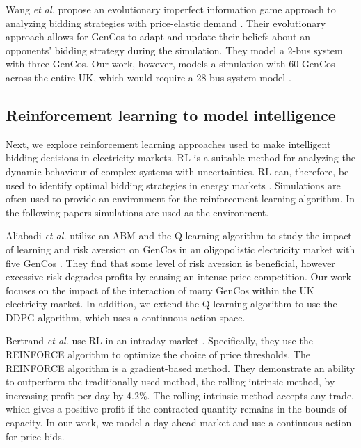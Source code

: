 Wang \textit{et al.} propose an evolutionary imperfect information game approach to analyzing bidding strategies with price-elastic demand \cite{Wang2011}. Their evolutionary approach allows for GenCos to adapt and update their beliefs about an opponents' bidding strategy during the simulation. They model a 2-bus system with three GenCos. Our work, however, models a simulation with 60 GenCos across the entire UK, which would require a 28-bus system model \cite{Bell2010}. 

\subsection{Reinforcement learning to model intelligence}

Next, we explore reinforcement learning approaches used to make intelligent bidding decisions in electricity markets. RL is a suitable method for analyzing the dynamic behaviour of complex systems with uncertainties. RL can, therefore, be used to identify optimal bidding strategies in energy markets \cite{Yang2020}. Simulations are often used to provide an environment for the reinforcement learning algorithm. In the following papers simulations are used as the environment.


Aliabadi \textit{et al.} utilize an ABM and the Q-learning algorithm to study the impact of learning and risk aversion on GenCos in an oligopolistic electricity market with five GenCos \cite{EsmaeiliAliabadi2017}. They find that some level of risk aversion is beneficial, however excessive risk degrades profits by causing an intense price competition. Our work focuses on the impact of the interaction of many GenCos within the UK electricity market. In addition, we extend the Q-learning algorithm to use the DDPG algorithm, which uses a continuous action space.

Bertrand \textit{et al.} use RL in an intraday market \cite{Bertrand2019}. Specifically, they use the REINFORCE algorithm to optimize the choice of price thresholds. The REINFORCE algorithm is a gradient-based method. They demonstrate an ability to outperform the traditionally used method, the rolling intrinsic method, by increasing profit per day by 4.2\%. The rolling intrinsic method accepts any trade, which gives a positive profit if the contracted quantity remains in the bounds of capacity. In our work, we model a day-ahead market and use a continuous action for price bids.

